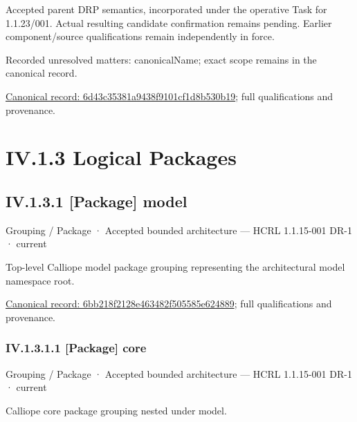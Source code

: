 Accepted parent DRP semantics, incorporated under the operative Task for 1.1.23/001. Actual resulting candidate confirmation remains pending. Earlier component/source qualifications remain independently in force.


{\small Recorded unresolved matters: canonicalName; exact scope remains in the canonical record.}\par
{\footnotesize \href{../../../../continuum/application/data-object/6d43c35381a9438f9101cf1d8b530b19.md}{Canonical record: 6d43c35381a9438f9101cf1d8b530b19}; full qualifications and provenance.}\par
\section*{IV.1.3 Logical Packages}
\label{navigation:IV.1.3}

\subsection*{IV.1.3.1 [Package] model}
\label{navigation:IV.1.3.1}

\label{element:6bb218f2128e463482f505585e624889}
{\small Grouping / Package · Accepted bounded architecture — HCRL 1.1.15-001 DR-1 · current}\par

Top-level Calliope model package grouping representing the architectural model namespace root.


{\footnotesize \href{../../../../continuum/grouping/package/6bb218f2128e463482f505585e624889.md}{Canonical record: 6bb218f2128e463482f505585e624889}; full qualifications and provenance.}\par
\subsubsection*{IV.1.3.1.1 [Package] core}
\label{navigation:IV.1.3.1.1}

\label{element:2d587cb7547e4e6a8c20aa64da0da78a}
{\small Grouping / Package · Accepted bounded architecture — HCRL 1.1.15-001 DR-1 · current}\par

Calliope core package grouping nested under model.


